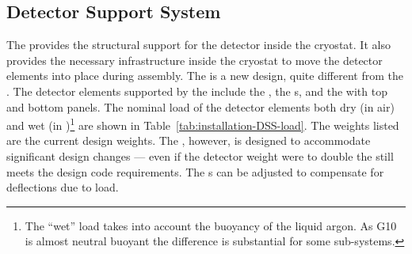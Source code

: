 \subsection{Detector Support System}
\label{sec:fdsp-tc-infr-dss}


The  provides the structural support for the detector inside the cryostat.  
It also provides the necessary infrastructure inside the cryostat to move the detector elements into place during assembly. 
The  is a new design, quite different from the  . The detector elements supported by the  include the , the s, and the  with top and bottom  panels. 
The nominal load of the detector elements both dry (in air) and wet (in )\footnote{The ``wet'' load takes into account the buoyancy of the liquid argon. As G10 is almost neutral buoyant the difference is substantial for some sub-systems.} are shown in Table~\ref{tab:installation-DSS-load}. 
The weights listed are the current design weights.  
The , however, is designed to accommodate significant design changes --- even if the detector weight were to double the  still meets the design code requirements.  
The \fdth{}s can be adjusted to compensate for deflections due to load.
